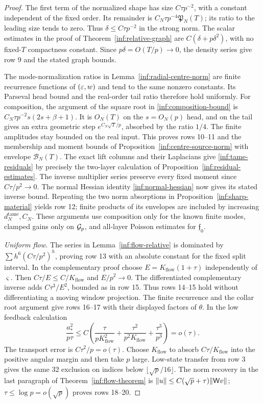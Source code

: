 \begin{proof}
The first term of the normalized shape has size $C\tau p^{-2}$,
with a constant independent of the fixed order. Its remainder is
$C_N\tau p^{-4}\mathfrak P_N(T)$; its ratio to the leading size
tends to zero. Thus $\delta\le C\tau p^{-2}$ in the strong norm.
The scalar estimates in the proof of Theorem~\ref{inf:relative-graph}
are $C(\delta+p\delta^2)$, with no fixed-$T$ compactness constant.
Since $p\delta=O(T/p)\to0$, the density series give row 9 and the
stated graph bounds.

The mode-normalization ratios in
Lemma~\ref{inf:radial-centre-norm} are finite recurrence functions
of $(\varepsilon,w)$ and tend to the same nonzero constants. Its Parseval
head bound and the real-order tail ratio therefore hold uniformly.
For composition, the argument of the square root in
\eqref{inf:composition-bound} is $C_N\tau p^{-2}s(2s+\beta+1)$.
It is $O_N(T)$ on the $s=O_N(p)$ head, and on the tail gives an
extra geometric step $e^{C_N\sqrt T/p}$, absorbed by the ratio
$1/4$. The finite amplitudes stay bounded on the real input.
This proves rows 10--11 and the membership and moment bounds of
Proposition~\ref{inf:centre-source-norm} with envelope $\mathcal B_N(T)$.
The exact lift columns and their Laplacians give
\eqref{inf:tame-residuals} by precisely the two-layer calculation
of Proposition~\ref{inf:residual-estimates}.
The inverse multiplier series preserve every fixed moment since
$C\tau/p^2\to0$.
The normal Hessian identity \eqref{inf:normal-hessian} now gives
its stated inverse bound. Repeating the two norm absorptions in
Proposition~\ref{inf:sharp-material} yields row 12; finite products
of its envelopes are included by increasing $d_N^{\mathrm{tame}},C_N$.
These arguments use composition only for the known finite modes,
clamped gains only on $\mathcal{G}_p$, and all-layer Poisson estimates
for $\mathfrak f_0$.

\emph{Uniform flow.}
The series in Lemma~\ref{inf:flow-relative} is dominated by
$\sum h^6(C\tau/p^2)^h$, proving row 13 with an absolute constant
for the fixed split interval. In the complementary proof choose
$E=K_{\mathrm{flow}}(1+\tau)$ independently of $\varsigma$.
Then $C\tau/E\le C/K_{\mathrm{flow}}$ and $E/p^2\to0$.
The differentiated complementary inverse adds
$C\tau^3/E^2$, bounded as in row 15. Thus rows 14--15 hold
without differentiating a moving window projection.
The finite recurrence and the collar root argument give rows
16--17 with their displayed factors of $\theta$.
In the low feedback calculation
\[
 \frac{a_*^2}{p\tau}
 \le C\left(\frac{\tau}{pK_{\mathrm{flow}}^2}
       +\frac{\tau^2}{p^2K_{\mathrm{flow}}}
       +\frac{\tau^3}{p^3}\right)=o(\tau).
\]
The transport error is $C\tau^2/p=o(\tau)$.
Choose $K_{\mathrm{flow}}$ to absorb $C\tau/K_{\mathrm{flow}}$
into the positive angular margin and then take $p$ large.
Low-state transfer from row 3 gives the same $32$ exclusion on
indices below $\lfloor\sqrt p/16\rfloor$.
The norm recovery in the last paragraph of
Theorem~\ref{inf:flow-theorem} is
$\lVert u\rVert\le C(\sqrt p+\tau)\lVert \mathsf Wv\rVert$;
$\tau\le\log p=o(\sqrt p)$ proves rows 18--20.


\end{proof}
